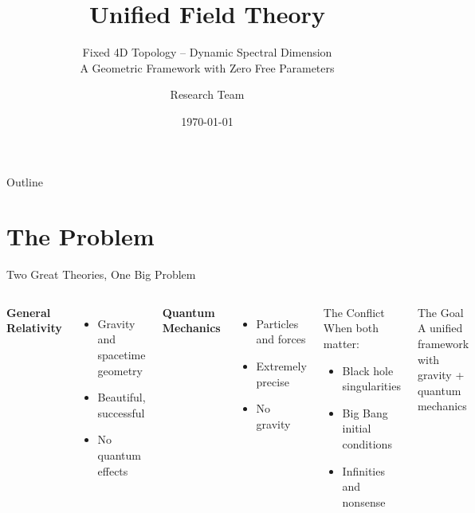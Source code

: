 \documentclass[aspectratio=169]{beamer}
\title[Unified Field Theory]{\textbf{Unified Field Theory}}
\subtitle{Fixed 4D Topology -- Dynamic Spectral Dimension\\A Geometric Framework with Zero Free Parameters}
\author{Research Team}
\institute{CTUFT Research Group}
\date{\today}
\begin{document}
\begin{frame}
\titlepage
\end{frame}

\begin{frame}{Outline}
\tableofcontents
\end{frame}

\section{The Problem}

\begin{frame}{Two Great Theories, One Big Problem}
\begin{columns}
\textbf{General Relativity}
\begin{itemize}
    \item Gravity and spacetime geometry
    \item Beautiful, successful
    \item No quantum effects
\end{itemize}

\vspace{0.5cm}

\textbf{Quantum Mechanics}
\begin{itemize}
    \item Particles and forces
    \item Extremely precise
    \item No gravity
\end{itemize}

\begin{block}{The Conflict}
When both matter:
\begin{itemize}
    \item Black hole singularities
    \item Big Bang initial conditions
    \item Infinities and nonsense
\end{itemize}
\end{block}

\begin{alertblock}{The Goal}
A unified framework with gravity + quantum mechanics
\end{alertblock}
\end{columns}
\end{frame}
\end{document}
